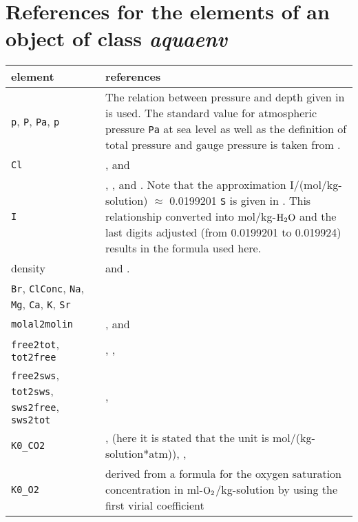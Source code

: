 \documentclass[article,nojss]{jss}
\begin{document}
\clearpage

\section{References for the elements of an object of class \textit{aquaenv}} \label{app: references}
\begin{footnotesize}
\begin{longtable}{p{}|p{}}
\textbf{element}& \textbf{references} \\ \hline 
\texttt{p}, \texttt{P}, \texttt{Pa}, \texttt{p} & The relation between pressure and depth given in \cite{Fofonoff1983} is used. The standard value for 
atmospheric pressure \texttt{Pa} at sea level as well as the definition of total pressure and gauge pressure is taken from \cite{Feistel2008}.\\
\texttt{Cl}          & \citet[ chapter 5, p. 11]{DOE1994}, and \citet[p. 100, footnote 3]{Zeebe2001}\\
\texttt{I}           & \citet[chapter 5, p. 13, 15]{DOE1994},  \citet[ p.12]{Zeebe2001}, and \citet[ p.257]{Roy1993b}. 
Note that the approximation I/(mol/kg-solution) $\approx$ 0.0199201 \; \texttt{S} is given in \citet[  p. 428.]{Millero1982}.
This relationship converted into mol/kg-$\rm H_2O$ and the last digits adjusted (from 0.0199201 to 0.019924) results in the formula used here.\\
density     & \citet{Millero1981} and \citet[chapter 5, p. 6f]{DOE1994}.\\
\texttt{Br}, \texttt{ClConc}, \texttt{Na}, \texttt{Mg}, \texttt{Ca}, \texttt{K}, \texttt{Sr} & \citet[ chapter 5, p.11]{DOE1994}\\    
\texttt{molal2molin} & \citet[ p.257]{Roy1993b}, and  \citet[chapter 5, p. 15]{DOE1994}\\
\texttt{free2tot}, \texttt{tot2free}  & \citet[p.2302]{Dickson1984}, \citet[ chapter 4, p.16]{DOE1994}, \citet[p.57, 261]{Zeebe2001}\\
\texttt{free2sws}, \texttt{tot2sws}, \texttt{sws2free}, \texttt{sws2tot} &  \citet[p.2303]{Dickson1984}, \citet[ p.57]{Zeebe2001}\\
\texttt{K0\_CO2}     & \citet{Weiss1974}, \citet[chapter 5, p. 13]{DOE1994} (here it is stated that the unit is mol/(kg-solution*atm)), \citet[ p.663]{Millero1995}, \citet[ p.257]{Zeebe2001}\\
\texttt{K0\_O2}      & derived from  a formula for the oxygen saturation concentration in ml-$\rm O_2$/kg-solution by \citet{Weiss1970} using the first virial coefficient

\end{longtable}
\end{footnotesize}
\end{document}
